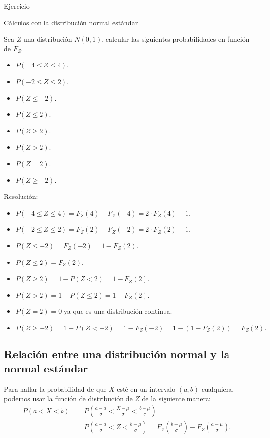 \documentclass[
  letterpaper,
  DIV=11,
  numbers=noendperiod]{scrreprt}
\providecommand{\tightlist}{%
  \setlength{\itemsep}{0pt}\setlength{\parskip}{0pt}}\usepackage{longtable,booktabs,array}
\begin{document}
\begin{Ejercicio}{Ejercicio}{}

Cálculos con la distribución normal estándar

Sea \(Z\) una distribución \(N(0,1)\), calcular las siguientes
probabilidades en función de \(F_Z\).

\begin{itemize}
\tightlist
\item
  \(P(-4\leq Z \leq 4).\)
\item
  \(P(-2\leq Z \leq 2).\)
\item
  \(P(Z\leq -2).\)
\item
  \(P( Z \leq 2).\)
\item
  \(P( Z \geq 2).\)
\item
  \(P( Z > 2).\)
\item
  \(P( Z = 2).\)
\item
  \(P( Z \geq -2).\)
\end{itemize}

Resolución:

\begin{itemize}
\tightlist
\item
  \(P(-4\leq Z \leq 4)=F_{Z}(4)-F_{Z}(-4)=2\cdot F_Z(4)-1\).
\item
  \(P(-2\leq Z \leq 2)=F_{Z}(2)-F_{Z}(-2)=2\cdot F_Z(2)-1\).
\item
  \(P(Z\leq -2)=F_Z(-2)=1-F_Z(2)\).
\item
  \(P( Z \leq 2)=F_{Z}(2)\).
\item
  \(P( Z \geq 2)=1-P(Z<2)=1-F_{Z}(2)\).
\item
  \(P( Z > 2)=1-P(Z\leq 2)=1-F_{Z}(2)\).
\item
  \(P( Z = 2)=0\) ya que es una distribución continua.
\item
  \(P( Z \geq -2)=1-P(Z< -2)=1-F_{Z}(-2)=1-(1-F_Z(2))=F_Z(2).\)
\end{itemize}

\end{Ejercicio}

\subsection{Relación entre una distribución normal y la normal
estándar}\label{relaciuxf3n-entre-una-distribuciuxf3n-normal-y-la-normal-estuxe1ndar}

Para hallar la probabilidad de que \(X\) esté en un intervalo \((a,b)\)
cualquiera, podemos usar la función de distribución de \(Z\) de la
siguiente manera: \[
\begin{array}{ll}
P(a<X<b)&=P\left(\frac{a-\mu}{\sigma}<\frac{X-\mu}{\sigma}<\frac{b-\mu}{\sigma}\right)= \\
&=P\left(\frac{a-\mu}{\sigma}<Z<\frac{b-\mu}{\sigma}\right)=F_{Z}\left(\frac{b-\mu}{\sigma}\right)-
F_{Z}\left(\frac{a-\mu}{\sigma}\right).
\end{array}
\]
\end{document}
